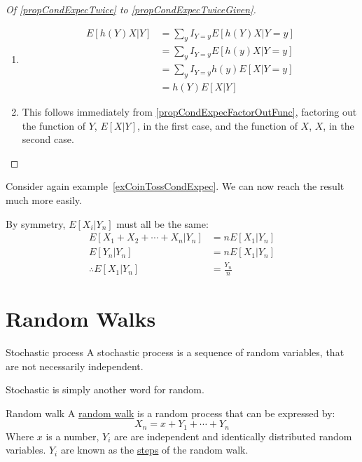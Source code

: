 \documentclass[../Main.tex]{subfiles}
\begin{document}
\begin{proof}[Of \ref{propCondExpecTwice} to \ref{propCondExpecTwiceGiven}]
\begin{enumerate}
        \item \begin{align*}
                E[h(Y) X | Y] &= \sum_y I_{Y = y} E[h(Y) X | Y = y] \\
                &= \sum_y I_{Y = y} E[h(y) X | Y = y] \\
                &= \sum_y I_{Y = y} h(y) E[X | Y = y] \\
                &= h(Y) E[X | Y]
            \end{align*}
        \item This follows immediately from \ref{propCondExpecFactorOutFunc}, factoring out the function of $Y$, $E[X | Y]$, in the first case, and the function of $X$, $X$, in the second case.
    \end{enumerate}
\end{proof}
\begin{example}
    Consider again example~\ref{exCoinTossCondExpec}. We can now reach the result much more easily.\par
    By symmetry, $E[X_i | Y_n]$ must all be the same:
    \begin{align*}
        E[X_1 + X_2 + \cdots + X_n | Y_n] &= n E[X_1 | Y_n] \\
        E[Y_n | Y_n] &= n E[X_1 | Y_n] \\
        \therefore E[X_1 | Y_n] &= \frac{Y_n}{n}
    \end{align*}
\end{example}
\section{Random Walks}
\begin{definition}{Stochastic process}
    A stochastic process is a sequence of random variables, that are not necessarily independent.    
\end{definition}
Stochastic is simply another word for random.
\begin{definition}{Random walk}
    A \underline{random walk} is a random process that can be expressed by:
    \begin{equation*}
        X_n = x + Y_1 + \cdots + Y_n
    \end{equation*}
    Where $x$ is a number, $Y_i$ are are independent and identically distributed random variables. $Y_i$ are known as the \underline{steps} of the random walk.
\end{definition}
\end{document}
